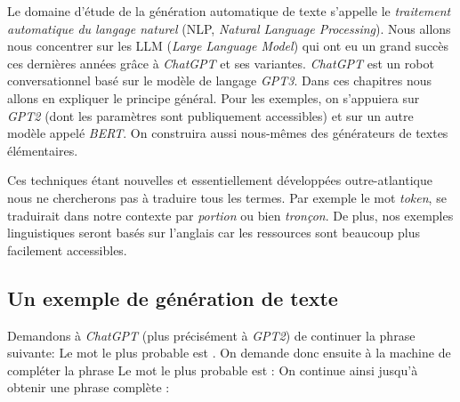 \documentclass[11pt,class=report,crop=false]{standalone}
\begin{document}
Le domaine d'étude de la génération automatique de texte s'appelle le \emph{traitement automatique du langage naturel} (NLP, \emph{Natural Language Processing}).
Nous allons nous concentrer sur les LLM (\emph{Large Language Model}) 
qui ont eu un grand succès ces dernières années grâce à \emph{ChatGPT} et ses variantes.
\emph{ChatGPT} est un robot conversationnel basé sur le modèle de langage \emph{GPT3}. Dans ces chapitres nous allons en expliquer le principe général. Pour les exemples, on s’appuiera sur \emph{GPT2} (dont les paramètres sont publiquement accessibles) et sur un autre modèle appelé \emph{BERT}. On construira aussi nous-mêmes des générateurs de textes élémentaires.

	
Ces techniques étant nouvelles et essentiellement développées outre-atlantique nous ne chercherons pas à traduire tous les termes. Par exemple le mot \emph{token}, se traduirait dans notre contexte par \emph{portion} ou bien \emph{tronçon}. De plus, nos exemples linguistiques seront basés sur l'anglais car les ressources sont beaucoup plus facilement accessibles.



\subsection{Un exemple de génération de texte}

Demandons à \emph{ChatGPT} (plus précisément à \emph{GPT2}) de continuer la phrase suivante:
Le mot le plus probable est \og{}\fg. On demande donc ensuite à la machine de compléter la phrase 
Le mot le plus probable est \og{}\fg{} :
On continue ainsi jusqu'à obtenir une phrase complète :
\end{document}
